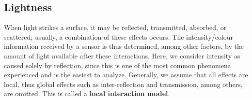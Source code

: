 


\subsection{Lightness}
When light strikes a surface, it may be reflected, transmitted, absorbed, or scattered; usually, a combination of these effects occurs. The intensity/colour information received by a sensor is thus determined, among other factors, by the amount of light available after these interactions. Here, we consider intensity as caused solely by reflection, since this is one of the most common phenomena experienced and is the easiest to analyze. Generally, we assume that all effects are local, thus global effects such as inter-reflection and transmission, among others, are omitted. This is called a \textbf{local interaction model}. 

